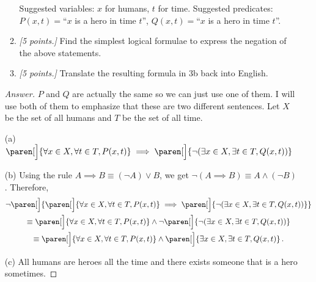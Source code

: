 \documentclass[12pt]{amsart}
\begin{document}
\begin{enumerate}[label=\arabic*.,itemsep=10pt, leftmargin=*]
\begin{enumerate}
            Suggested variables: $x$ for humans, 
            $t$ for time.
            Suggested predicates: 
            $P(x,t)=$``$x$ is a hero in time $t$'',
            $Q(x,t)=$``$x$ is a hero in time $t$''.
            

            \item 
        \textit{[5 points.]}
            Find the simplest logical formulae 
                to express the negation of the above statements. 
                
            \item
        \textit{[5 points.]}
            Translate the resulting formula in 3b back into English. 

        \end{enumerate}

        \begin{proof}[Answer]
            $P$ and $Q$ are actually the same so we can just use one of them.
            I will use both of them to emphasize that these are two different
            sentences.
            Let $X$ be the set of all humans and $T$ be the set of all time.

        (a) $\paren[\Big]{ \forall x \in X, \forall t \in T, P(x,t) }  \implies
    \paren[\Big]{ \neg ( \exists x\in X, \exists t\in T, Q(x,t))  }$

        (b) 
        Using the rule $A\implies B \equiv (\neg A) \vee B$, we get
        $\neg (A \implies B) \equiv A \wedge (\neg B)$. Therefore, 
        \begin{gather*}
    \neg \paren[\Big]{\paren[\Big]{ \forall x \in X, \forall t \in T, P(x,t) }  \implies
    \paren[\Big]{ \neg ( \exists x\in X, \exists t\in T, Q(x,t))  }} \\
    \equiv \paren[\Big]{ \forall x \in X, \forall t \in T, P(x,t) }
                \wedge 
   \neg \paren[\Big]{ \neg ( \exists x\in X, \exists t\in T, Q(x,t))  } \\
    \equiv \paren[\Big]{ \forall x \in X, \forall t \in T, P(x,t) }
                \wedge 
            \paren[\Big]{ \exists x\in X, \exists t\in T, Q(x,t) }  \,.
\end{gather*}

    (c) All humans are heroes all the time and there exists someone that is 
    a hero sometimes.
        \end{proof}
\end{enumerate}
\end{document}

